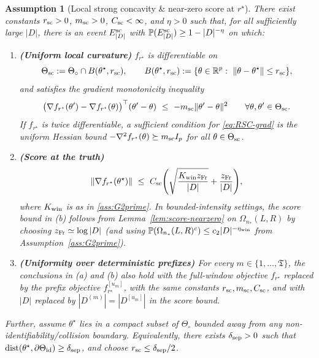 \documentclass{statsoc}
\newtheorem{assumption}[assumption]{Assumption}
\newcommand{\bbP}{\mathbb{P}}
\newcommand{\bbR}{\mathbb{R}}
\newcommand{\1}{\mathbbm{1}}
\newcommand{\Tmax}{\mathfrak{T}}
\begin{document}
\begin{assumption}[Local strong concavity \& near-zero score at $r^\star$]\label{ass:G6}
There exist constants $r_{\rm sc}>0$, $m_{\rm sc}>0$, $C_{\rm sc}<\infty$, and $\eta>0$ such that, for all sufficiently large $|D|$, there is an event $E^{\rm sc}_{|D|}$ with $\bbP(E^{\rm sc}_{|D|})\ge 1-|D|^{-\eta}$ on which:

\begin{enumerate}[nosep,label=(\alph*)]
\item \textbf{(Uniform local curvature)}
$f_{r^\star}$ is differentiable on
\[
\Theta_{\rm sc}:=\Theta_\circ\cap B(\theta^\star,r_{\rm sc}),
\qquad
B(\theta^\star,r_{\rm sc}):=\{\theta\in\bbR^p:\ \|\theta-\theta^\star\|\le r_{\rm sc}\},
\]
and satisfies the gradient monotonicity inequality
\begin{equation}\label{eq:RSC-grad}
\big(\nabla f_{r^\star}(\theta')-\nabla f_{r^\star}(\theta)\big)^\top(\theta'-\theta)
\ \le\ -m_{\rm sc}\|\theta'-\theta\|^2
\qquad\forall\theta,\theta'\in\Theta_{\rm sc}.
\end{equation}
If $f_{r^\star}$ is twice differentiable, a sufficient condition for \eqref{eq:RSC-grad} is the uniform Hessian bound
$-\nabla^2 f_{r^\star}(\theta)\succeq m_{\rm sc}I_p$ for all $\theta\in\Theta_{\rm sc}$.

\item \textbf{(Score at the truth)} 
\[
\|\nabla f_{r^\star}(\theta^\star)\|\ \le\ C_{\rm sc}\!\left(\sqrt{\frac{K_{\rm win} z_{\rm Fr}}{|D|}} + \frac{z_{\rm Fr}}{|D|}\right)\!,
\]
where $K_{\rm win}$ is as in \cref{ass:G2prime}. In bounded-intensity settings, the score bound in (b) follows from Lemma~\ref{lem:score-nearzero} on $\Omega_{n_*}(L,R)$ by choosing $z_{\rm Fr}\simeq \log|D|$ (and using $\bbP(\Omega_{n_*}(L,R)^c)\le c_2|D|^{-\eta_{\rm win}}$ from Assumption~\ref{ass:G2prime}).


\item \textbf{(Uniformity over deterministic prefixes)} 
For every $m\in\{1,\dots,\Tmax\}$, the conclusions in (a) and (b) also hold with the full-window objective
$f_{r^\star}$ replaced by the prefix objective $f_{r^\star}^{[u_m]}$, with the same constants
$r_{\rm sc},m_{\rm sc},C_{\rm sc}$, and with $|D|$ replaced by $|D^{(m)}|=|D^{[u_m]}|$ in the score bound.

\end{enumerate}


Further, assume $\theta^\star$ lies in a compact subset of $\Theta_\circ$ bounded away from any non-identifiability/collision boundary. Equivalently, there exists $\delta_{\rm sep}>0$ such that $\mathrm{dist}(\theta^\star,\partial\Theta_{\rm id})\ge \delta_{\rm sep}$,
and choose $r_{\rm sc}\le \delta_{\rm sep}/2$.
\end{assumption}
\end{document}
